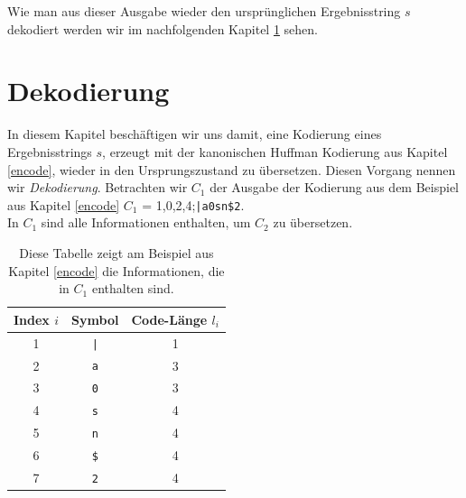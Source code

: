 \documentclass[a4paper,11pt]{scrartcl}%
\theoremstyle{change}
\theoremstyle{nonumberplain}
\theoremstyle{change}
\theoremstyle{nonumberplain}
\theoremstyle{change}
\theoremstyle{nonumberplain}
\begin{document}
Wie man aus dieser Ausgabe wieder den ursprünglichen Ergebnisstring $s$ dekodiert werden wir im nachfolgenden Kapitel \ref{decode} sehen.


\section{Dekodierung}\label{decode}

In diesem Kapitel beschäftigen wir uns damit, eine Kodierung eines Ergebnisstrings $s$, erzeugt mit der kanonischen Huffman Kodierung aus Kapitel \ref{encode}, wieder in den Ursprungszustand zu übersetzen. Diesen Vorgang nennen wir \textit{Dekodierung}.
Betrachten wir $C_1$ der Ausgabe der Kodierung aus dem Beispiel aus Kapitel \ref{encode} $C_1$ = 1,0,2,4;\texttt{|a0sn\$2}. 
\\In $C_1$ sind alle Informationen enthalten, um $C_2$ zu übersetzen. 

\begin{table}[h]
		\begin{center}
		
		\begin{tabular}[h]{|c|c|c|}\hline
			Index $i$ & Symbol & Code-Länge $l_i$  \\ \hline 
 		 	1 &\texttt{|} & 1 		\\ \hline
 			2 & \texttt{a} & 3 	\\ \hline
			3 & \texttt{0} & 3 		\\ \hline
 			4 & \texttt{s} & 4 	\\ \hline
 			5 & \texttt{n} & 4	\\ \hline
  			6 & \texttt{\$} & 4 	\\ \hline
  			7 & \texttt{2} & 4 	\\ \hline
		\end{tabular} 
		\end{center}
		\caption{Diese Tabelle zeigt am Beispiel aus Kapitel \ref{encode} die Informationen, die in $C_1$ enthalten sind. }
\end{table}
\end{document}
